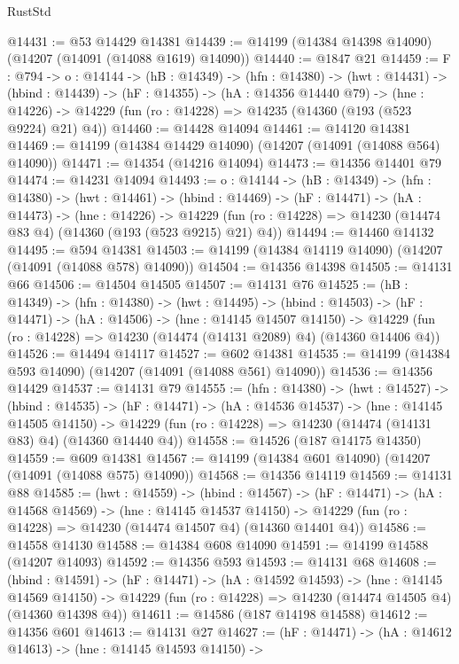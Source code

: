 \begin{lexlean}{RustStd}
\begin{coremodule}
@14431 := @53 @14429 @14381
@14439 := @14199 (@14384 @14398 @14090) (@14207 (@14091 (@14088 @1619) @14090))
@14440 := @1847 @21
@14459 := {F : @794} ->
  {o : @14144} ->
  (hB : @14349) ->
  (hfn : @14380) ->
  (hwt : @14431) ->
  (hbind : @14439) ->
  (hF : @14355) ->
  (hA : @14356 @14440 @79) ->
  (hne : @14226) -> @14229 (fun (ro : @14228) => @14235 (@14360 (@193 (@523 @9224) @21) @4))
@14460 := @14428 @14094
@14461 := @14120 @14381
@14469 := @14199 (@14384 @14429 @14090) (@14207 (@14091 (@14088 @564) @14090))
@14471 := @14354 (@14216 @14094)
@14473 := @14356 @14401 @79
@14474 := @14231 @14094
@14493 := {o : @14144} ->
  (hB : @14349) ->
  (hfn : @14380) ->
  (hwt : @14461) ->
  (hbind : @14469) ->
  (hF : @14471) ->
  (hA : @14473) ->
  (hne : @14226) ->
  @14229 (fun (ro : @14228) => @14230 (@14474 @83 @4) (@14360 (@193 (@523 @9215) @21) @4))
@14494 := @14460 @14132
@14495 := @594 @14381
@14503 := @14199 (@14384 @14119 @14090) (@14207 (@14091 (@14088 @578) @14090))
@14504 := @14356 @14398
@14505 := @14131 @66
@14506 := @14504 @14505
@14507 := @14131 @76
@14525 := (hB : @14349) ->
  (hfn : @14380) ->
  (hwt : @14495) ->
  (hbind : @14503) ->
  (hF : @14471) ->
  (hA : @14506) ->
  (hne : @14145 @14507 @14150) ->
  @14229 (fun (ro : @14228) => @14230 (@14474 (@14131 @2089) @4) (@14360 @14406 @4))
@14526 := @14494 @14117
@14527 := @602 @14381
@14535 := @14199 (@14384 @593 @14090) (@14207 (@14091 (@14088 @561) @14090))
@14536 := @14356 @14429
@14537 := @14131 @79
@14555 := (hfn : @14380) ->
  (hwt : @14527) ->
  (hbind : @14535) ->
  (hF : @14471) ->
  (hA : @14536 @14537) ->
  (hne : @14145 @14505 @14150) ->
  @14229 (fun (ro : @14228) => @14230 (@14474 (@14131 @83) @4) (@14360 @14440 @4))
@14558 := @14526 (@187 @14175 @14350)
@14559 := @609 @14381
@14567 := @14199 (@14384 @601 @14090) (@14207 (@14091 (@14088 @575) @14090))
@14568 := @14356 @14119
@14569 := @14131 @88
@14585 := (hwt : @14559) ->
  (hbind : @14567) ->
  (hF : @14471) ->
  (hA : @14568 @14569) ->
  (hne : @14145 @14537 @14150) ->
  @14229 (fun (ro : @14228) => @14230 (@14474 @14507 @4) (@14360 @14401 @4))
@14586 := @14558 @14130
@14588 := @14384 @608 @14090
@14591 := @14199 @14588 (@14207 @14093)
@14592 := @14356 @593
@14593 := @14131 @68
@14608 := (hbind : @14591) ->
  (hF : @14471) ->
  (hA : @14592 @14593) ->
  (hne : @14145 @14569 @14150) ->
  @14229 (fun (ro : @14228) => @14230 (@14474 @14505 @4) (@14360 @14398 @4))
@14611 := @14586 (@187 @14198 @14588)
@14612 := @14356 @601
@14613 := @14131 @27
@14627 := (hF : @14471) ->
  (hA : @14612 @14613) ->
  (hne : @14145 @14593 @14150) ->

\end{coremodule}
\end{lexlean}
